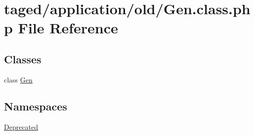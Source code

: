 \hypertarget{_gen_8class_8php}{}\section{taged/application/old/\+Gen.class.\+php File Reference}
\label{_gen_8class_8php}
\subsection*{Classes}
\begin{DoxyCompactItemize}
\item 
class \hyperlink{class_gen}{Gen}
\end{DoxyCompactItemize}
\subsection*{Namespaces}
\begin{DoxyCompactItemize}
\item 
 \hyperlink{namespace_deprecated}{Deprecated}
\end{DoxyCompactItemize}
